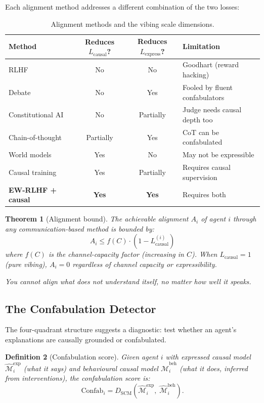 \documentclass[11pt,a4paper]{article}
\newtheorem{theorem}{Theorem}[section]
\newtheorem{definition}[theorem]{Definition}
\begin{document}
Each alignment method addresses a different combination of the two losses:

\begin{table}[h]
\centering
\renewcommand{\arraystretch}{1.3}
\begin{tabular}{lccl}
\toprule
\textbf{Method} & \textbf{Reduces $L_{\text{causal}}$?} &
\textbf{Reduces $L_{\text{express}}$?} & \textbf{Limitation} \\
\midrule
RLHF & No & No & Goodhart (reward hacking) \\
Debate & No & Yes & Fooled by fluent confabulators \\
Constitutional AI & No & Partially & Judge needs causal depth too \\
Chain-of-thought & Partially & Yes & CoT can be confabulated \\
World models & Yes & No & May not be expressible \\
Causal training & Yes & Partially & Requires causal supervision \\
\textbf{EW-RLHF + causal} & \textbf{Yes} & \textbf{Yes} & Requires both \\
\bottomrule
\end{tabular}
\caption{Alignment methods and the vibing scale dimensions.}
\label{tab:alignment}
\end{table}

\begin{theorem}[Alignment bound]\label{thm:alignment-bound}
The achievable alignment $A_i$ of agent $i$ through any
communication-based method is bounded by:
\begin{equation}
    A_i \leq f(C) \cdot (1 - L_{\text{causal}}^{(i)})
\end{equation}
where $f(C)$ is the channel-capacity factor (increasing in $C$).
When $L_{\text{causal}} = 1$ (pure vibing), $A_i = 0$ regardless
of channel capacity or expressibility.
\end{theorem}

\emph{You cannot align what does not understand itself, no matter
how well it speaks.}


\subsection{The Confabulation Detector}

The four-quadrant structure suggests a diagnostic: test whether an
agent's explanations are causally grounded or confabulated.

\begin{definition}[Confabulation score]\label{def:confab}
Given agent $i$ with expressed causal model $\hat{\mathcal{M}}_i^{\text{exp}}$
(what it says) and behavioural causal model $\hat{\mathcal{M}}_i^{\text{beh}}$
(what it does, inferred from interventions), the confabulation score is:
\begin{equation}
    \text{Confab}_i = D_{\text{SCM}}(\hat{\mathcal{M}}_i^{\text{exp}},\;
    \hat{\mathcal{M}}_i^{\text{beh}}).
\end{equation}
\end{definition}
\end{document}
